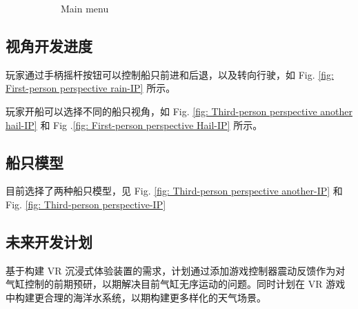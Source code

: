 \documentclass[a4paper,10pt]{article}
\begin{document}
\begin{figure}[htbp]
\begin{subfigure}{0.3\textwidth}
				\captionsetup{font=scriptsize}
				\caption{Main menu}
				\label{fig: Main menu-IP}	
			\end{subfigure}
			
			\captionsetup{font=scriptsize}
			\caption{
				\label{fig: Scene}						
			}
		\end{figure}
	
		\subsection{视角开发进度}
		
		玩家通过手柄摇杆按钮可以控制船只前进和后退，以及转向行驶，如 Fig. \ref{fig: First-person perspective rain-IP} 所示。
		
		玩家开船可以选择不同的船只视角，如 Fig. \ref{fig: Third-person perspective another hail-IP} 和 Fig .\ref{fig: First-person perspective Hail-IP} 所示。
		
		\subsection{船只模型}
		
		目前选择了两种船只模型，见 Fig. \ref{fig: Third-person perspective another-IP} 和 Fig. \ref{fig: Third-person perspective-IP}
		
		\subsection{未来开发计划}
		
		基于构建 VR 沉浸式体验装置的需求，计划通过添加游戏控制器震动反馈作为对气缸控制的前期预研，以期解决目前气缸无序运动的问题。同时计划在 VR 游戏中构建更合理的海洋水系统，以期构建更多样化的天气场景。		
		

	
	
\end{document}
